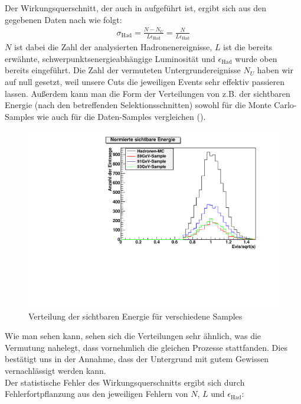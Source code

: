 Der Wirkungsquerschnitt, der auch in  aufgeführt ist, ergibt sich aus den gegebenen Daten nach \cite[Gl.13]{script} wie folgt:
\begin{eqnarray}
\sigma_\mathrm{Had} = \frac{N - N_U}{L\epsilon_\mathrm{Had}} = \frac{N}{L\epsilon_\mathrm{Had}}
\end{eqnarray}
$N$ ist dabei die Zahl der analysierten Hadronenereignisse, $L$ ist die bereits erwähnte, schwerpunktsenergieabhängige Luminosität und $\epsilon_\mathrm{Had}$ wurde oben bereits eingeführt. Die Zahl der vermuteten Untergrundereignisse $N_U$ haben wir auf null gesetzt, weil unsere Cuts die jeweiligen Events sehr effektiv passieren lassen. Außerdem kann man die Form der Verteilungen von z.B. der sichtbaren Energie (nach den betreffenden Selektionsschnitten) sowohl für die Monte Carlo-Samples wie auch für die Daten-Samples vergleichen ().
\begin{figure}[htb]
	\centering
	\includegraphics[width=1\columnwidth,keepaspectratio]{Evis_vgl.pdf}
	\caption{Verteilung der sichtbaren Energie für verschiedene Samples}
	\label{fig:Evis_vgl}
\end{figure}
Wie man sehen kann, sehen sich die Verteilungen sehr ähnlich, was die Vermutung nahelegt, dass vornehmlich die gleichen Prozesse stattfanden. Dies bestätigt uns in der Annahme, dass der Untergrund mit gutem Gewissen vernachlässigt werden kann.\\
Der statistische Fehler des Wirkungsquerschnitts ergibt sich durch Fehlerfortpflanzung aus den jeweiligen Fehlern von $N$, $L$ und $\epsilon_\mathrm{Had}$:
